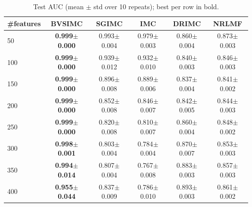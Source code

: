 \begin{table}[t]
\centering
\caption{Test AUC (mean $\pm$ std over 10 repeats); best per row in bold.}
\label{tab:auc}
\begin{tabular}{lccccc}
\toprule
\#features & BVSIMC & SGIMC & IMC & DRIMC & NRLMF \\
\midrule
50 & \textbf{0.999$\pm$0.000} & 0.993$\pm$0.004 & 0.979$\pm$0.003 & 0.860$\pm$0.004 & 0.873$\pm$0.003 \\
100 & \textbf{0.999$\pm$0.000} & 0.939$\pm$0.012 & 0.932$\pm$0.010 & 0.840$\pm$0.003 & 0.846$\pm$0.003 \\
150 & \textbf{0.999$\pm$0.000} & 0.896$\pm$0.008 & 0.889$\pm$0.006 & 0.837$\pm$0.004 & 0.841$\pm$0.002 \\
200 & \textbf{0.999$\pm$0.000} & 0.852$\pm$0.008 & 0.846$\pm$0.007 & 0.842$\pm$0.005 & 0.844$\pm$0.003 \\
250 & \textbf{0.999$\pm$0.000} & 0.820$\pm$0.008 & 0.810$\pm$0.007 & 0.860$\pm$0.004 & 0.848$\pm$0.002 \\
300 & \textbf{0.998$\pm$0.001} & 0.803$\pm$0.004 & 0.784$\pm$0.004 & 0.870$\pm$0.007 & 0.853$\pm$0.003 \\
350 & \textbf{0.994$\pm$0.014} & 0.807$\pm$0.004 & 0.767$\pm$0.008 & 0.883$\pm$0.003 & 0.857$\pm$0.003 \\
400 & \textbf{0.955$\pm$0.044} & 0.837$\pm$0.009 & 0.786$\pm$0.010 & 0.893$\pm$0.003 & 0.861$\pm$0.002 \\
\bottomrule
\end{tabular}
\end{table}
